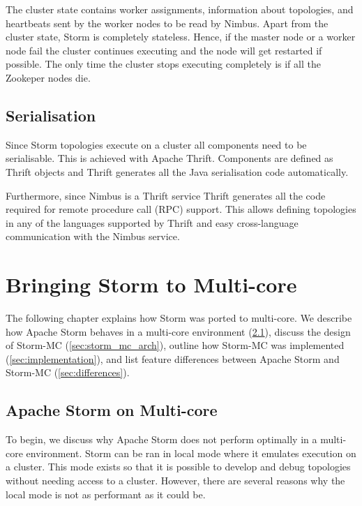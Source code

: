 \documentclass[bsc,twoside,singlespacing,normalheadings,parskip]{infthesis}\usepackage[]{graphicx}\usepackage[]{color}
\let\Oldtodo\todo
\renewcommand{\todo}[1]{\Oldtodo[inline]{#1}}
\begin{document}
The cluster state contains worker assignments, information about topologies, and heartbeats sent by the worker nodes to be read by Nimbus. Apart from the cluster state, Storm is completely stateless. Hence, if the master node or a worker node fail the cluster continues executing and the node will get restarted if possible. The only time the cluster stops executing  completely is if all the Zookeper nodes die.

\section{Serialisation}
\label{sec:serialisation}

Since Storm topologies execute on a cluster all components need to be serialisable. This is achieved with Apache Thrift. Components are defined as Thrift objects and Thrift generates all the Java serialisation code automatically.

Furthermore, since Nimbus is a Thrift service Thrift generates all the code required for remote procedure call (RPC) support. This allows defining topologies in any of the languages supported by Thrift and easy cross-language communication with the Nimbus service.

\todo{multilang}

\todo{metrics}

\todo{hooks}
\clearpage{}

\clearpage{}\chapter{Bringing Storm to Multi-core}

The following chapter explains how Storm was ported to multi-core. We describe how Apache Storm behaves in a multi-core environment (\ref{sec:storm_on_mc}), discuss the design of Storm-MC (\ref{sec:storm_mc_arch}), outline how Storm-MC was implemented (\ref{sec:implementation}), and list feature differences between Apache Storm and Storm-MC (\ref{sec:differences}).

\section{Apache Storm on Multi-core}
\label{sec:storm_on_mc}

To begin, we discuss why Apache Storm does not perform optimally in a multi-core environment. Storm can be ran in local mode where it emulates execution on a cluster. This mode exists so that it is possible to develop and debug topologies without needing access to a cluster. However, there are several reasons why the local mode is not as performant as it could be.
\end{document}
